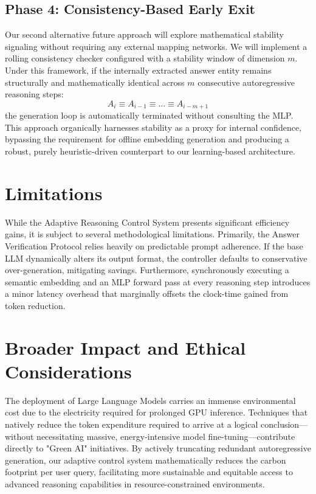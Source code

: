 \documentclass[11pt]{article}
\begin{document}
\subsection{Phase 4: Consistency-Based Early Exit}
Our second alternative future approach will explore mathematical stability signaling without requiring any external mapping networks. We will implement a rolling consistency checker configured with a stability window of dimension $m$. Under this framework, if the internally extracted answer entity remains structurally and mathematically identical across $m$ consecutive autoregressive reasoning steps:
\begin{equation}
    A_i \equiv A_{i-1} \equiv \dots \equiv A_{i-m+1}
\end{equation}
the generation loop is automatically terminated without consulting the MLP. This approach organically harnesses stability as a proxy for internal confidence, bypassing the requirement for offline embedding generation and producing a robust, purely heuristic-driven counterpart to our learning-based architecture.

\section{Limitations}
While the Adaptive Reasoning Control System presents significant efficiency gains, it is subject to several methodological limitations. Primarily, the Answer Verification Protocol relies heavily on predictable prompt adherence. If the base LLM dynamically alters its output format, the controller defaults to conservative over-generation, mitigating savings. Furthermore, synchronously executing a semantic embedding and an MLP forward pass at every reasoning step introduces a minor latency overhead that marginally offsets the clock-time gained from token reduction.

\section{Broader Impact and Ethical Considerations}
The deployment of Large Language Models carries an immense environmental cost due to the electricity required for prolonged GPU inference. Techniques that natively reduce the token expenditure required to arrive at a logical conclusion—without necessitating massive, energy-intensive model fine-tuning—contribute directly to "Green AI" initiatives. By actively truncating redundant autoregressive generation, our adaptive control system mathematically reduces the carbon footprint per user query, facilitating more sustainable and equitable access to advanced reasoning capabilities in resource-constrained environments.
\end{document}
